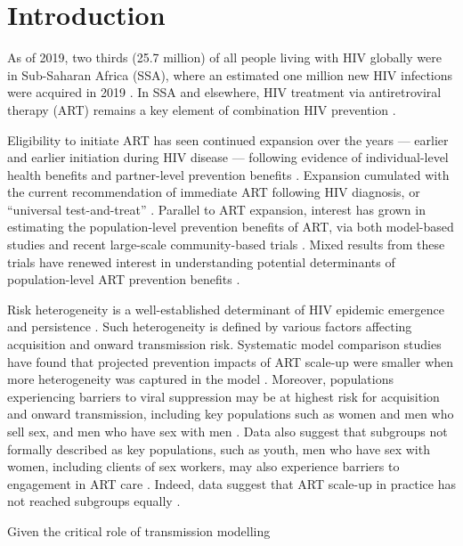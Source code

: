 \section{Introduction}
As of 2019, two thirds (25.7 million) of all people living with HIV globally
were in Sub-Saharan Africa (SSA), where
an estimated one million new HIV infections were acquired in 2019 \cite{AIDSinfo}.
In SSA and elsewhere, HIV treatment via antiretroviral therapy (ART)
remains a key element of combination HIV prevention \cite{WHO2016ART}.
\par
Eligibility to initiate ART has seen continued expansion over the years
--- \ie earlier and earlier initiation during HIV disease ---
following evidence of individual-level health benefits \cite{Lundgren2015,Danel2015}
and partner-level prevention benefits \cite{Anglemyer2013,Cohen2016}.
Expansion cumulated with the current recommendation of
immediate ART following HIV diagnosis, or ``universal test-and-treat'' \cite{WHO2016ART}.
Parallel to ART expansion, interest has grown in estimating
the population-level prevention benefits of ART, via both
model-based studies \cite{Granich2009,Eaton2012,Delva2012,Cori2014} and
recent large-scale community-based trials \cite{Havlir2019,Hayes2019,Iwuji2018}.
Mixed results from these trials \cite{Havlir2019,Hayes2019,Iwuji2018}
have renewed interest in understanding potential determinants of
population-level ART prevention benefits \cite{Baral2019,Havlir2020}.
\par
Risk heterogeneity is a well-established determinant of
HIV epidemic emergence and persistence \cite{Anderson1986,Boily1997}.
Such heterogeneity is defined by various factors affecting acquisition and onward transmission risk.
Systematic model comparison studies have found that projected prevention impacts of ART scale-up
were smaller when more heterogeneity was captured in the model \cite{Hontelez2013,Rozhnova2016}.
Moreover, populations experiencing barriers to viral suppression
may be at highest risk for acquisition and onward transmission, including key populations such as
women and men who sell sex, and men who have sex with men \cite{Hakim2018,Nyato2019}.
Data also suggest that subgroups not formally described as key populations,
such as youth, men who have sex with women, including clients of sex workers, may also
experience barriers to engagement in ART care \cite{Arnesen2017,Chikwari2018,Quinn2019}.
Indeed, data suggest that ART scale-up in practice
has not reached subgroups equally \cite{Green2020}.
\par
Given the critical role of transmission modelling
